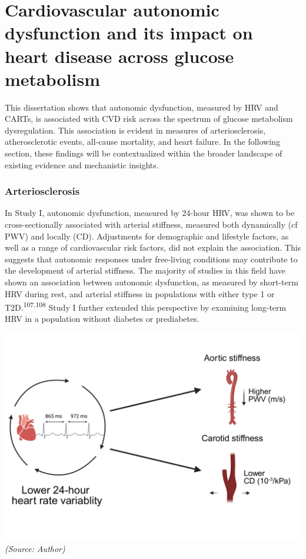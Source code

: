 \documentclass[
  a4paper,
  headsepline=true,
  open=left]{scrbook}
\begin{document}
\hypertarget{cardiovascular-autonomic-dysfunction-and-its-impact-on-heart-disease-across-glucose-metabolism}{%
\section{Cardiovascular autonomic dysfunction and its impact on heart
disease across glucose
metabolism}\label{cardiovascular-autonomic-dysfunction-and-its-impact-on-heart-disease-across-glucose-metabolism}}

This dissertation shows that autonomic dysfunction, measured by HRV and
CARTs, is associated with CVD risk across the spectrum of glucose
metabolism dysregulation. This association is evident in measures of
arteriosclerosis, atherosclerotic events, all-cause mortality, and heart
failure. In the following section, these findings will be contextualized
within the broader landscape of existing evidence and mechanistic
insights.

\hypertarget{arteriosclerosis-1}{%
\subsubsection{Arteriosclerosis}\label{arteriosclerosis-1}}

In Study I, autonomic dysfunction, measured by 24-hour HRV, was shown to
be cross-sectionally associated with arterial stiffness, measured both
dynamically (cf PWV) and locally (CD). Adjustments for demographic and
lifestyle factors, as well as a range of cardiovascular risk factors,
did not explain the association. This suggests that autonomic responses
under free-living conditions may contribute to the development of
arterial stiffness. The majority of studies in this field have shown an
association between autonomic dysfunction, as measured by short-term HRV
during rest, and arterial stiffness in populations with either type 1 or
T2D.\textsuperscript{107,108} Study I further extended this perspective
by examining long-term HRV in a population without diabetes or
prediabetes.

\includegraphics{images/hrv_arterial_stiffness.pdf} \emph{(Source:
Author)}
\end{document}
